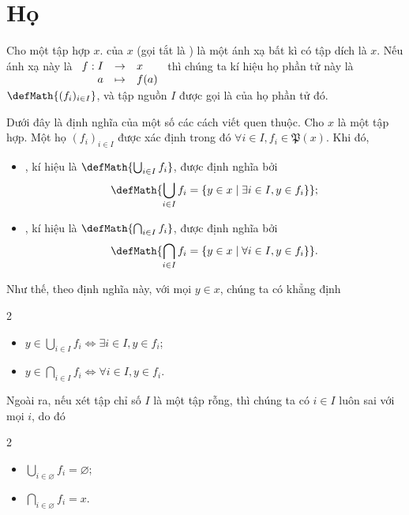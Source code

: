 \section{Họ}

Cho một tập hợp $x$.  của $x$ (gọi tắt là ) là một ánh xạ bất kì có tập dích là $x$. Nếu ánh xạ này là $\begin{array}[t]{rcl}  
f: I & \to & x\\       
   a & \mapsto & f(a) 
\end{array}$ thì chúng ta kí hiệu họ phần tử này là $\defMath{(f_i)_{i \in I}}$, và tập nguồn $I$ được gọi là  của họ phần tử đó.

Dưới đây là định nghĩa của một số các cách viết quen thuộc. Cho $x$ là một tập hợp. Một họ $(f_i)_{i \in I}$ được xác định trong đó $\forall i \in I, f_i \in \mathfrak{P}(x)$. Khi đó, \begin{itemize}
   \item {}, kí hiệu là $\defMath{\bigcup_{i \in I}f_i}$, được định nghĩa bởi $$
   \defMath{\bigcup_{i \in I}f_i = \{y \in x \mid \exists i \in I, y \in f_i\}};
   $$
   \item {}, kí hiệu là $\defMath{\bigcap_{i \in I}f_i}$, được định nghĩa bởi $$
   \defMath{\bigcap_{i \in I}f_i = \{y \in x \mid \forall i \in I, y \in f_i\}}.$$
\end{itemize}
Như thế, theo định nghĩa này, với mọi $y \in x$, chúng ta có khẳng định
\begin{multicols}{2}
   \begin{itemize}
      \item $y \in \bigcup_{i \in I}f_i \iff \exists i \in I, y \in f_i$;
      \item $y \in \bigcap_{i \in I}f_i \iff \forall i \in I, y \in f_i$.
   \end{itemize}
\end{multicols}
Ngoài ra, nếu xét tập chỉ số $I$ là một tập rỗng, thì chúng ta có $i \in I$ luôn sai với mọi $i$, do đó 
\begin{multicols}{2}
   \begin{itemize}
      \item $\bigcup_{i \in \varnothing}f_i = \varnothing$;
      \item $\bigcap_{i \in \varnothing}f_i = x$.
   \end{itemize}
\end{multicols}

